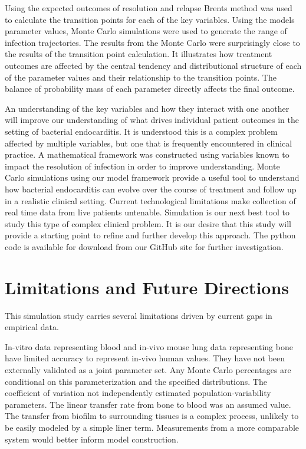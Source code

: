 \documentclass[journal]{IEEEtran}
\begin{document}
Using the expected outcomes of resolution and relapse Brents method was used to calculate the transition points for each of the key variables.  Using the models parameter values, Monte Carlo simulations were used to generate the range of infection trajectories.  The results from the Monte Carlo were surprisingly close to the results of the transition point calculation.  It illustrates how treatment outcomes are affected by the central tendency and distributional structure of each of the parameter values and their relationship to the transition points.  The balance of probability mass of each parameter directly affects the final outcome.

An understanding of the key variables and how they interact with one another will improve our understanding of what drives individual patient outcomes in the setting of bacterial endocarditis.  It is understood this is a complex problem affected by multiple variables, but one that is frequently encountered in clinical practice.  A mathematical framework was constructed using variables known to impact the resolution of infection in order to improve understanding.  Monte Carlo simulations using our model framework provide a useful tool to understand how bacterial endocarditis can evolve over the course of treatment and follow up in a realistic clinical setting.   Current technological limitations make collection of real time data from live patients untenable.  Simulation is our next best tool to study this type of complex clinical problem. It is our desire that this study will provide a starting point to refine and further develop this approach.  The python code is available for download from our GitHub site for further investigation.

\section{Limitations and Future Directions}

This simulation study carries several limitations driven by current gaps
in empirical data.

In-vitro data representing blood and in-vivo mouse lung data representing bone have limited accuracy to represent in-vivo human values.  They have not been externally validated as a joint parameter set. Any Monte Carlo percentages are conditional on this parameterization and the specified distributions. The coefficient of variation not independently estimated population-variability parameters. The linear transfer rate from bone to blood was an assumed value.  The transfer from biofilm to surrounding tissues is a complex process, unlikely to be easily modeled by a simple liner term. Measurements from a more comparable system would better inform model construction.
\end{document}
